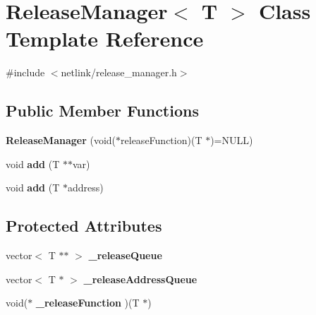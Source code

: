 \hypertarget{classReleaseManager}{}\section{Release\+Manager$<$ T $>$ Class Template Reference}
\label{classReleaseManager}


{\ttfamily \#include $<$netlink/release\+\_\+manager.\+h$>$}

\subsection*{Public Member Functions}
\begin{DoxyCompactItemize}
\item 
\hypertarget{classReleaseManager_a52cd29519b454a83dffdb282e601acfa}{}{\bfseries Release\+Manager} (void($\ast$release\+Function)(T $\ast$)=N\+U\+L\+L)\label{classReleaseManager_a52cd29519b454a83dffdb282e601acfa}

\item 
\hypertarget{classReleaseManager_a4cbea873df1e51c2d337e201623d8a67}{}void {\bfseries add} (T $\ast$$\ast$var)\label{classReleaseManager_a4cbea873df1e51c2d337e201623d8a67}

\item 
\hypertarget{classReleaseManager_af2dc4d35911de92c4b84f9be82e6e25b}{}void {\bfseries add} (T $\ast$address)\label{classReleaseManager_af2dc4d35911de92c4b84f9be82e6e25b}

\end{DoxyCompactItemize}
\subsection*{Protected Attributes}
\begin{DoxyCompactItemize}
\item 
\hypertarget{classReleaseManager_a377023e66c1ecd5cf0d16a80e1a9b0bb}{}vector$<$ T $\ast$$\ast$ $>$ {\bfseries \+\_\+release\+Queue}\label{classReleaseManager_a377023e66c1ecd5cf0d16a80e1a9b0bb}

\item 
\hypertarget{classReleaseManager_ac8a2b36b8540e109cb1ea89cea83c4e8}{}vector$<$ T $\ast$ $>$ {\bfseries \+\_\+release\+Address\+Queue}\label{classReleaseManager_ac8a2b36b8540e109cb1ea89cea83c4e8}

\item 
\hypertarget{classReleaseManager_a3a011107bd8d4ea8d7b955c59098d73c}{}void($\ast$ {\bfseries \+\_\+release\+Function} )(T $\ast$)\label{classReleaseManager_a3a011107bd8d4ea8d7b955c59098d73c}

\end{DoxyCompactItemize}


